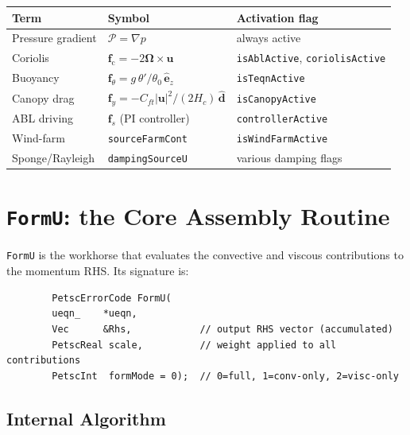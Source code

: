 \documentclass[12pt,a4paper]{article}
\newcommand{\bu}{\bm{u}}
\newcommand{\cP}{\mathcal{P}}
\begin{document}
	\begin{center}
		\begin{tabular}{lll}
			\toprule
			Term & Symbol & Activation flag \\
			\midrule
			Pressure gradient & $\cP = \nabla p$ & always active \\
			Coriolis & $\bm{f}_\text{c} = -2\bm{\Omega}\times\bu$ & \texttt{isAblActive}, \texttt{coriolisActive} \\
			Buoyancy & $\bm{f}_\theta = g\,\theta'/\theta_0\,\hat{\bm{e}}_z$ & \texttt{isTeqnActive} \\
			Canopy drag & $\bm{f}_y = -C_{ft}|\bu|^2/(2H_c)\,\hat{\bm{d}}$ & \texttt{isCanopyActive} \\
			ABL driving & $\bm{f}_s$ (PI controller) & \texttt{controllerActive} \\
			Wind-farm & \texttt{sourceFarmCont} & \texttt{isWindFarmActive} \\
			Sponge/Rayleigh & \texttt{dampingSourceU} & various damping flags \\
			\bottomrule
		\end{tabular}
	\end{center}
	
	\section{\texttt{FormU}: the Core Assembly Routine}
	
	\texttt{FormU} is the workhorse that evaluates the convective and
	viscous contributions to the momentum RHS. Its signature is:
	
	\begin{lstlisting}
		PetscErrorCode FormU(
		ueqn_    *ueqn,
		Vec      &Rhs,            // output RHS vector (accumulated)
		PetscReal scale,          // weight applied to all contributions
		PetscInt  formMode = 0);  // 0=full, 1=conv-only, 2=visc-only
	\end{lstlisting}
	
	\subsection{Internal Algorithm}
	
\end{document}

